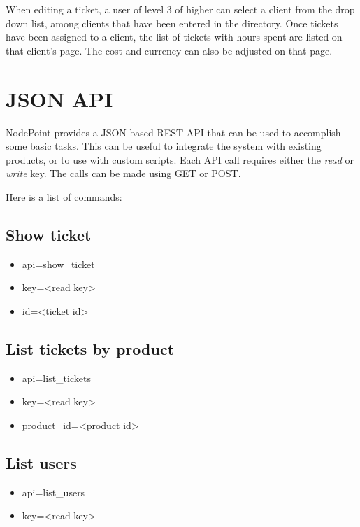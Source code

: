 \documentclass[11pt]{article}
\begin{document}
When editing a ticket, a user of level 3 of higher can select a client from the drop down list, among clients that have been entered in the directory. Once tickets have been assigned to a client, the list of tickets with hours spent are listed on that client's page. The cost and currency can also be adjusted on that page.

\clearpage
\section{JSON API}
NodePoint provides a JSON based REST API that can be used to accomplish some basic tasks. This can be useful to integrate the system with existing products, or to use with custom scripts. Each API call requires either the \textit{read} or \textit{write} key. The calls can be made using GET or POST.

Here is a list of commands:

\subsection{Show ticket}

\begin{itemize}
\item api=show\_ticket
\item key=<read key>
\item id=<ticket id>
\end{itemize}

\subsection{List tickets by product}

\begin{itemize}
\item api=list\_tickets
\item key=<read key>
\item product\_id=<product id>
\end{itemize}

\subsection{List users}

\begin{itemize}
\item api=list\_users
\item key=<read key>
\end{itemize}
\end{document}
